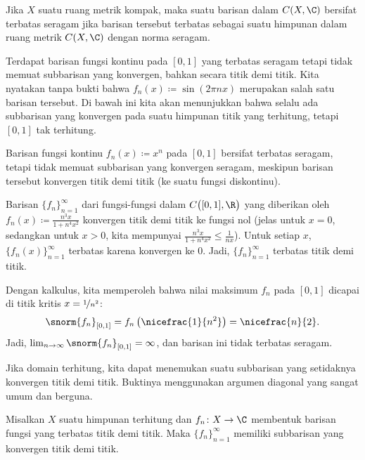 Jika $X$ suatu ruang metrik kompak, maka suatu barisan dalam $C(X,\C)$
bersifat terbatas seragam jika barisan tersebut terbatas sebagai suatu himpunan dalam ruang metrik
$C(X,\C)$ dengan norma seragam.

\begin{example}
Terdapat barisan
fungsi kontinu
pada $[0,1]$ yang terbatas seragam tetapi tidak memuat subbarisan yang konvergen,
bahkan secara titik demi titik.
Kita nyatakan tanpa bukti bahwa $f_n(x) \coloneqq \sin (2\pi n x)$ merupakan salah satu
barisan tersebut.
Di bawah ini kita akan menunjukkan bahwa selalu ada
subbarisan yang konvergen pada suatu himpunan titik
yang terhitung, tetapi $[0,1]$ tak terhitung.
\end{example}

\begin{example}
Barisan fungsi kontinu $f_n(x) \coloneqq x^n$ pada $[0,1]$
bersifat terbatas seragam, tetapi tidak memuat subbarisan yang konvergen
seragam,
meskipun barisan tersebut konvergen titik demi titik (ke suatu fungsi diskontinu).
\end{example}

\begin{example}
Barisan $\{ f_n \}_{n=1}^\infty$ dari fungsi-fungsi dalam $C\bigl([0,1],\R\bigr)$ yang diberikan oleh
$f_n(x) \coloneqq \frac{n^3x}{1+n^4x^2}$
konvergen titik demi titik ke fungsi nol (jelas untuk $x=0$, sedangkan untuk $x > 0$,
kita mempunyai $\frac{n^3x}{1+n^4x^2} \leq \frac{1}{nx}$).
Untuk setiap $x$, $\{f_n(x)\}_{n=1}^\infty$ terbatas karena konvergen ke 0.
Jadi, $\{ f_n \}_{n=1}^\infty$ terbatas titik demi titik.

Dengan kalkulus, kita memperoleh bahwa nilai maksimum
$f_n$ pada
$[0,1]$ dicapai di titik kritis
$x=\nicefrac{1}{n^2}$:
\begin{equation*}
\snorm{f_n}_{[0,1]}
=
f_n\left(\nicefrac{1}{n^2}\right)
= \nicefrac{n}{2} .
\end{equation*}
Jadi, $\lim_{n\to\infty} \snorm{f_n}_{[0,1]} = \infty$, dan
barisan ini tidak terbatas seragam.
\end{example}

Jika domain terhitung, kita dapat menemukan suatu subbarisan
yang setidaknya konvergen titik demi titik.
Buktinya menggunakan argumen diagonal yang sangat umum dan berguna.

\begin{prop} \label{prop:subsequenceoncountableX}
Misalkan $X$ suatu himpunan terhitung dan $f_n \colon X \to \C$ membentuk
barisan fungsi yang terbatas titik demi titik.  Maka $\{ f_n \}_{n=1}^\infty$ memiliki subbarisan yang konvergen
titik demi titik.
\end{prop}

